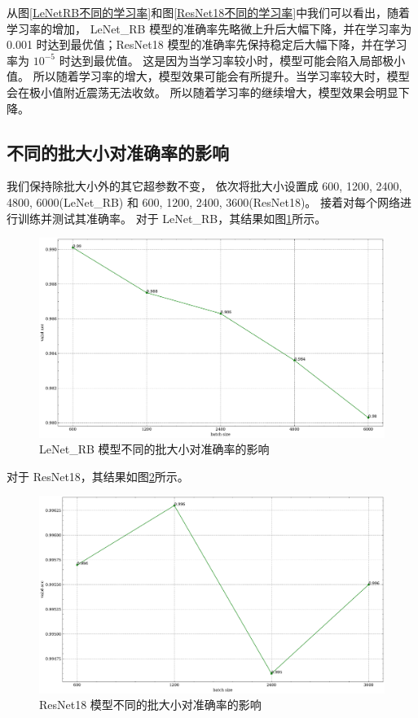 \documentclass[supercite]{Experimental_Report}
\theoremstyle{definition}
\begin{document}
从图\ref{LeNetRB不同的学习率}和图\ref{ResNet18不同的学习率}中我们可以看出，随着学习率的增加，
LeNet\_RB 模型的准确率先略微上升后大幅下降，并在学习率为 0.001 时达到最优值；ResNet18 模型的准确率先保持稳定后大幅下降，并在学习率为 $10^{-5}$ 时达到最优值。
这是因为当学习率较小时，模型可能会陷入局部极小值。
所以随着学习率的增大，模型效果可能会有所提升。当学习率较大时，模型会在极小值附近震荡无法收敛。
所以随着学习率的继续增大，模型效果会明显下降。

\subsection{不同的批大小对准确率的影响}
我们保持除批大小外的其它超参数不变，
依次将批大小设置成 600, 1200, 2400, 4800, 6000(LeNet\_RB) 和 600, 1200, 2400, 3600(ResNet18)。
接着对每个网络进行训练并测试其准确率。
对于 LeNet\_RB，其结果如图\ref{LeNetRB不同的batchsize}所示。
\begin{figure}[H]
	\begin{center}
		\includegraphics[scale=0.35]{../images/LeNetRB不同的batchsize.pdf}
		\caption{LeNet\_RB 模型不同的批大小对准确率的影响}
		\label{LeNetRB不同的batchsize}
	\end{center}
\end{figure}

对于 ResNet18，其结果如图\ref{ResNet18不同的batchsize}所示。
\begin{figure}[H]
	\begin{center}
		\includegraphics[scale=0.35]{../images/ResNet18不同的batchsize.pdf}
		\caption{ResNet18 模型不同的批大小对准确率的影响}
		\label{ResNet18不同的batchsize}
	\end{center}
\end{figure}
\end{document}
